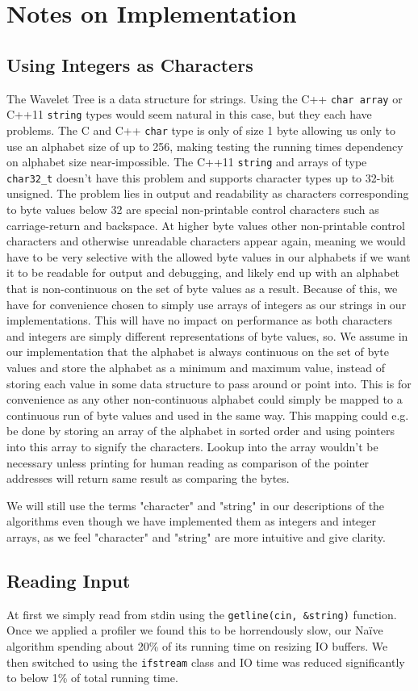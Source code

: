 \section{Notes on Implementation}

\subsection{Using Integers as Characters}
\label{sec:UsingIntAsChar}
The Wavelet Tree is a data structure for strings. Using the C++ \texttt{char array} or C++11 \texttt{string} types would seem natural in this case, but they each have problems.
The C and C++ \texttt{char} type is only of size 1 byte allowing us only to use an alphabet size of up to 256, making testing the running times dependency on alphabet size near-impossible.
The C++11 \texttt{string} and arrays of type \texttt{char32\_t} doesn't have this problem and supports character types up to 32-bit unsigned. The problem lies in output and readability as characters corresponding to byte values below 32 are special non-printable control characters such as carriage-return and backspace. At higher byte values other non-printable control characters and otherwise unreadable characters appear again, meaning we would have to be very selective with the allowed byte values in our alphabets if we want it to be readable for output and debugging, and likely end up with an alphabet that is non-continuous on the set of byte values as a result.
Because of this, we have for convenience chosen to simply use arrays of integers as our strings in our implementations.
This will have no impact on performance as both characters and integers are simply different representations of byte values, so.
We assume in our implementation that the alphabet is always continuous on the set of byte values and store the alphabet as a minimum and maximum value, instead of storing each value in some data structure to pass around or point into.
This is for convenience as any other non-continuous alphabet could simply be mapped to a continuous run of byte values and used in the same way. 
This mapping could e.g. be done by storing an array of the alphabet in sorted order and using pointers into this array to signify the characters. 
Lookup into the array wouldn't be necessary unless printing for human reading as comparison of the pointer addresses will return same result as comparing the bytes.

We will still use the terms "character" and "string" in our descriptions of the algorithms even though we have implemented them as integers and integer arrays, as we feel "character" and "string" are more intuitive and give clarity.


\subsection{Reading Input}
At first we simply read from stdin using the \texttt{getline(cin, \&string)} function. Once we applied a profiler we found this to be horrendously slow, our Naïve algorithm spending about 20\% of its running time on resizing IO buffers. We then switched to using the \texttt{ifstream} class and IO time was reduced significantly to below 1\% of total running time.